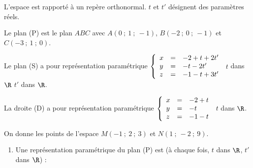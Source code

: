 \documentclass{cornouaille}
\begin{document}
\begin{colonne*exercice}
\begin{exercice}
  \medskip
 
  L'espace est rapporté à un repère orthonormal. $t$ et $t'$ désignent
  des paramètres réels.

  Le plan (P) est le plan $ABC$ avec $A(0~;~1~;~-1)$, $B(-2~;~0~;~-1)$
  et $C(-3~;~1~;~0)$.

  Le plan (S) a pour représentation paramétrique
  $\left\{\begin{array}{l c l}
            x&=&- 2 + t + 2t'\\
            y&=&- t - 2t'\\
            z&=&- 1 - t + 3t'
          \end{array}\right.$  $t$ dans $\R$ $t'$ dans $\R$.

        La droite (D) a pour représentation paramétrique
        $\left\{\begin{array}{l c l}
                  x&=&- 2 + t\\
                  y&=&- t \\
                  z&=&- 1 - t
                \end{array}\right.$ $t$ dans $\R$.
 
              On donne les points de l'espace $M(-1~;~2~;~3)$ et
              $N(1~;~-2~;~9)$.

              \medskip
 
              \begin{enumerate}
              \item Une représentation paramétrique du plan (P) est (à
                chaque fois, $t$ dans $\R$, $t'$ dans $\R$) :


\end{enumerate}
\end{exercice}
\end{colonne*exercice}
\end{document}
